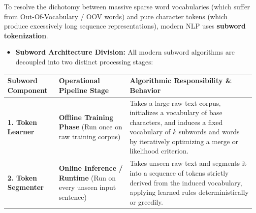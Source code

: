 \documentclass[10pt,a4paper]{article}
\begin{document}
\vspace{3pt}
\par\vspace{1pt}
To resolve the dichotomy between massive sparse word vocabularies (which suffer from Out-Of-Vocabulary / OOV words) and pure character tokens (which produce excessively long sequence representations), modern NLP uses \textbf{subword tokenization}.

\begin{itemize}[leftmargin=12pt, itemsep=1pt, parsep=0pt, topsep=1pt]
    \item \textbf{Subword Architecture Division:} All modern subword algorithms are decoupled into two distinct processing stages:
\end{itemize}

\vspace{-2pt}
\begin{center}
\footnotesize
\renewcommand{\arraystretch}{1.1}
\begin{tabularx}{\textwidth}{>{\raggedright\arraybackslash}p{3.2cm} >{\raggedright\arraybackslash}p{4.2cm} >{\raggedright\arraybackslash}X}
\toprule
\rowcolor{lightbg}
\textbf{Subword Component} & \textbf{Operational Pipeline Stage} & \textbf{Algorithmic Responsibility \& Behavior} \\
\midrule
\textbf{1. Token Learner} & \textbf{Offline Training Phase} \newline (Run once on raw training corpus) & Takes a large raw text corpus, initializes a vocabulary of base characters, and induces a fixed vocabulary of $k$ subwords and words by iteratively optimizing a merge or likelihood criterion. \\
\midrule
\textbf{2. Token Segmenter} & \textbf{Online Inference / Runtime} \newline (Run on every unseen input sentence) & Takes unseen raw text and segments it into a sequence of tokens strictly derived from the induced vocabulary, applying learned rules deterministically or greedily. \\
\bottomrule
\end{tabularx}
\end{center}

\newpage

\end{document}
